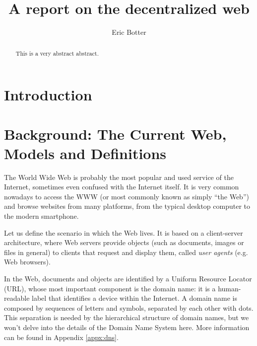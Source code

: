 \documentclass[mscthesis]{usiinfthesis}
\title{A report on the decentralized web} %
\subtitle{} %
\author{Eric Botter} %
\begin{document}
\maketitle %

\frontmatter %

\begin{abstract}
This is a very abstract abstract.

\lipsum
\end{abstract}


\begin{acknowledgements}
\lipsum
\end{acknowledgements}

\tableofcontents

\mainmatter

\chapter{Introduction}\label{ch:intro}


\chapter{Background: The Current Web, Models and Definitions}
\label{ch:background}

The World Wide Web is probably the most popular and used service of the Internet, sometimes even confused with the Internet itself. It is very common nowadays to access the WWW (or most commonly known as simply ``the Web'') and browse websites from many platforms, from the typical desktop computer to the modern smartphone.

Let us define the scenario in which the Web lives. It is based on a client-server architecture, where Web servers provide objects (such as documents, images or files in general) to clients that request and display them, called \textit{user agents} (e.g. Web browsers).

In the Web, documents and objects are identified by a Uniform Resource Locator (URL), whose most important component is the domain name: it is a human-readable label that identifies a device within the Internet.
A domain name is composed by sequences of letters and symbols, separated by each other with dots. This separation is needed by the hierarchical structure of domain names, but we won't delve into the details of the Domain Name System here. More information can be found in Appendix \ref{appx:dns}. %
\end{document}
